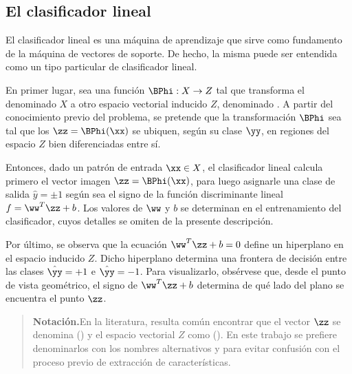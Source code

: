 %
%
\subsection{El clasificador lineal}
%
El clasificador lineal es una máquina de aprendizaje \cite{nilsson}
que sirve como fundamento de la máquina de vectores de soporte. De
hecho, la misma puede ser entendida como un tipo particular de
clasificador lineal.

En primer lugar, sea una función $\BPhi:X\rightarrow{}Z$ tal que
transforma el denominado  $X$ a otro espacio
vectorial inducido $Z$, denominado .  A partir del
conocimiento previo del problema, se pretende que la transformación
$\BPhi$ sea tal que los  $\zz=\BPhi(\xx)$ se
ubiquen, según su clase $\yy$, en regiones del espacio $Z$ bien
diferenciadas entre sí.

Entonces, dado un patrón de entrada $\xx\in{}X$, el clasificador
lineal calcula primero el vector imagen $\zz=\BPhi(\xx)$, para luego
asignarle una clase de salida $\hat{y}=\pm{}1$ según sea el signo de
la función discriminante lineal $f=\ww^T\zz+b$. Los valores de $\ww$
y $b$ se determinan en el entrenamiento del clasificador, cuyos detalles
se omiten de la presente descripción.

Por último, se observa que la ecuación $\ww^T\zz+b=0$ define un
hiperplano en el espacio inducido $Z$. Dicho hiperplano determina una
frontera de decisión entre las clases $\hat{\yy}=+1$ e
$\hat{\yy}=-1$. Para visualizarlo, obsérvese que, desde el punto de
vista geométrico, el signo de $\ww^T\zz+b$ determina de qué lado del
plano se encuentra el punto $\zz$.
%
\begin{quote}
  {\bfseries Notación.}\quad{}En la literatura, resulta común
  encontrar que el vector $\zz$ se denomina  () y el espacio vectorial $Z$
  como  ().  En
  este trabajo se prefiere denominarlos con los nombres alternativos
   y  para evitar
  confusión con el proceso previo de extracción de características.
\end{quote}
%
